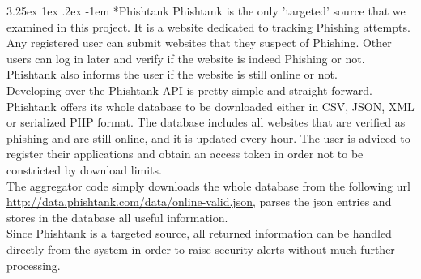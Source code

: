 \documentclass[12pt]{article}
\makeatletter
\renewcommand\paragraph{\@startsection{paragraph}{5}{\z@}%
  {3.25ex \@plus1ex \@minus.2ex}%
  {-1em}%
  {\normalfont\normalsize\bfseries}}
\makeatother
\begin{document}
\paragraph*{Phishtank}
\hfill \break
Phishtank is the only 'targeted' source that we examined in this project. It is a website dedicated to tracking Phishing attempts. Any registered user can submit websites that they suspect of Phishing. Other users can log in later and verify if the website is indeed Phishing or not. Phishtank also informs the user if the website is still online or not.\\

Developing over the Phishtank API is pretty simple and straight forward. Phishtank offers its whole database to be downloaded either in CSV, JSON, XML or serialized PHP format. The database includes all websites that are verified as phishing and are still online, and it is updated every hour. The user is adviced to register their applications and obtain an access token in order not to be constricted by download limits. \\

The aggregator code simply downloads the whole database from the following url \url{http://data.phishtank.com/data/online-valid.json}, parses the json entries and stores in the database all useful information. \\

Since Phishtank is a targeted source, all returned information can be handled directly from the system in order to raise security alerts without much further processing. 
 
\end{document}
